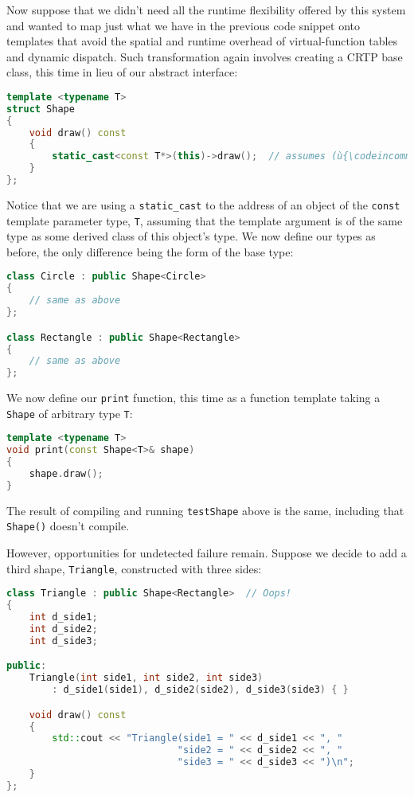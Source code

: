 \noindent Now suppose that we didn't need all the runtime flexibility offered by
this system and wanted to map just what we have in the previous code
snippet onto templates that avoid the spatial and runtime overhead of
virtual-function tables and dynamic dispatch. Such transformation again
involves creating a CRTP base class, this time in lieu of our abstract
interface:

\begin{lstlisting}[language=C++]
template <typename T>
struct Shape
{
    void draw() const
    {
        static_cast<const T*>(this)->draw();  // assumes (ù{\codeincomments{T}}ù) derives from (ù{\codeincomments{Shape}}ù)
    }
};
\end{lstlisting}
    
\noindent Notice that we are using a \texttt{static\_cast} to the address of an
object of the \texttt{const} template parameter type, \texttt{T},
assuming that the template argument is of the same type as some derived
class of this object's type. We now define our types as before, the only
difference being the form of the base type:

\begin{lstlisting}[language=C++]
class Circle : public Shape<Circle>
{
    // same as above
};

class Rectangle : public Shape<Rectangle>
{
    // same as above
};
\end{lstlisting}
    
\noindent We now define our \texttt{print} function, this time as a function
template taking a \texttt{Shape} of arbitrary type \texttt{T}:

\begin{lstlisting}[language=C++]
template <typename T>
void print(const Shape<T>& shape)
{
    shape.draw();
}
\end{lstlisting}
    
\noindent The result of compiling and running \texttt{testShape} above is the
same, including that \texttt{Shape()} doesn't compile.

However, opportunities for undetected failure remain. Suppose we decide
to add a third shape, \texttt{Triangle}, constructed with three sides:

\begin{lstlisting}[language=C++]
class Triangle : public Shape<Rectangle>  // Oops!
{
    int d_side1;
    int d_side2;
    int d_side3;

public:
    Triangle(int side1, int side2, int side3)
        : d_side1(side1), d_side2(side2), d_side3(side3) { }

    void draw() const
    {
        std::cout << "Triangle(side1 = " << d_side1 << ", "
                              "side2 = " << d_side2 << ", "
                              "side3 = " << d_side3 << ")\n";
    }
};
\end{lstlisting}
    
